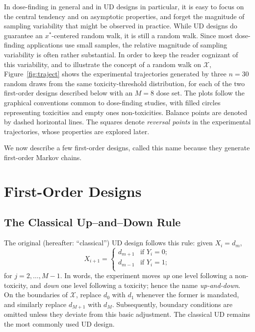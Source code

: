  In dose-finding in general and in UD designs in particular, it is easy to focus on the central tendency and on asymptotic properties, and forget the magnitude of sampling variability that might be observed in practice. While UD designs do guarantee an $x^*$-centered random walk, it is still a random walk. Since most dose-finding applications use small samples, the relative magnitude of sampling variability is often rather substantial. In order to keep the reader cognizant of this variability, and to illustrate the concept of a random walk on $\mathcal{X}$, Figure~\ref{fig:traject} shows the experimental trajectories generated by three $n=30$ random draws from the same toxicity-threshold distribution, for each of the two first-order designs described below with an $M=8$ dose set. The plots follow the graphical conventions common to dose-finding studies, with filled circles representing toxicities and empty ones non-toxicities. Balance points are denoted by dashed horizontal lines. The squares denote \emph{reversal points} in the experimental trajectories, whose properties are explored later.

We now describe a few first-order designs, called this name because they generate first-order Markov chains.

\section{First-Order Designs}\label{sec:tour}
\subsection{The Classical Up--and--Down Rule}

The original (hereafter: ``classical'') UD design follows this rule: given $X_i=d_m$,
\begin{equation*}
X_{i+1}=
\begin{cases}
d_{m+1} &\textrm{if $Y_i=0$};\\
d_{m-1} &\textrm{if $Y_i=1$};\\
\end{cases}
\end{equation*}
for $j=2,\ldots,M-1$. In words, the experiment moves \emph{up} one level following a non-toxicity, and \emph{down} one level following a toxicity; hence the name \emph{up-and-down}. On the boundaries of $\mathcal{X}$, replace $d_0$ with $d_1$ whenever the former is mandated, and similarly replace $d_{M+1}$ with $d_M$. Subsequently, boundary conditions are omitted unless they deviate from this basic adjustment.  The classical UD remains the most commonly used UD design.

